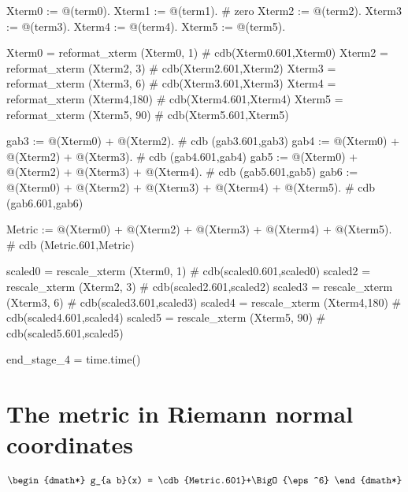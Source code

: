 \documentclass[12pt]{cdblatex}
\begin{document}
\begin{cadabra}
   Xterm0 := @(term0).
   Xterm1 := @(term1).  # zero
   Xterm2 := @(term2).
   Xterm3 := @(term3).
   Xterm4 := @(term4).
   Xterm5 := @(term5).

   Xterm0 = reformat_xterm (Xterm0,  1)    # cdb(Xterm0.601,Xterm0)
   Xterm2 = reformat_xterm (Xterm2,  3)    # cdb(Xterm2.601,Xterm2)
   Xterm3 = reformat_xterm (Xterm3,  6)    # cdb(Xterm3.601,Xterm3)
   Xterm4 = reformat_xterm (Xterm4,180)    # cdb(Xterm4.601,Xterm4)
   Xterm5 = reformat_xterm (Xterm5, 90)    # cdb(Xterm5.601,Xterm5)

   gab3   := @(Xterm0) + @(Xterm2).                                      # cdb (gab3.601,gab3)
   gab4   := @(Xterm0) + @(Xterm2) + @(Xterm3).                          # cdb (gab4.601,gab4)
   gab5   := @(Xterm0) + @(Xterm2) + @(Xterm3) + @(Xterm4).              # cdb (gab5.601,gab5)
   gab6   := @(Xterm0) + @(Xterm2) + @(Xterm3) + @(Xterm4) + @(Xterm5).  # cdb (gab6.601,gab6)

   Metric := @(Xterm0) + @(Xterm2) + @(Xterm3) + @(Xterm4) + @(Xterm5).  # cdb (Metric.601,Metric)

   scaled0 = rescale_xterm (Xterm0,  1)    # cdb(scaled0.601,scaled0)
   scaled2 = rescale_xterm (Xterm2,  3)    # cdb(scaled2.601,scaled2)
   scaled3 = rescale_xterm (Xterm3,  6)    # cdb(scaled3.601,scaled3)
   scaled4 = rescale_xterm (Xterm4,180)    # cdb(scaled4.601,scaled4)
   scaled5 = rescale_xterm (Xterm5, 90)    # cdb(scaled5.601,scaled5)

   end_stage_4 = time.time()
\end{cadabra}

\clearpage

\section*{The metric in Riemann normal coordinates}

\begin{dgroup*}
   \begin{dmath*} g_{a b}(x) = \cdb{Metric.601}+\BigO{\eps^6} \end{dmath*}
\end{dgroup*}

\clearpage

\end{document}
